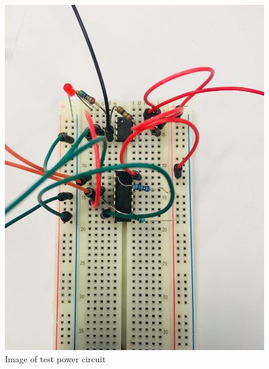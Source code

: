 \begin{figure}
	\includegraphics[width=0.5\linewidth]{Figures/powercircuit.jpg}\centering
	\caption{Image of test power circuit}
	\label{fig:power_circuit}
\end{figure}




